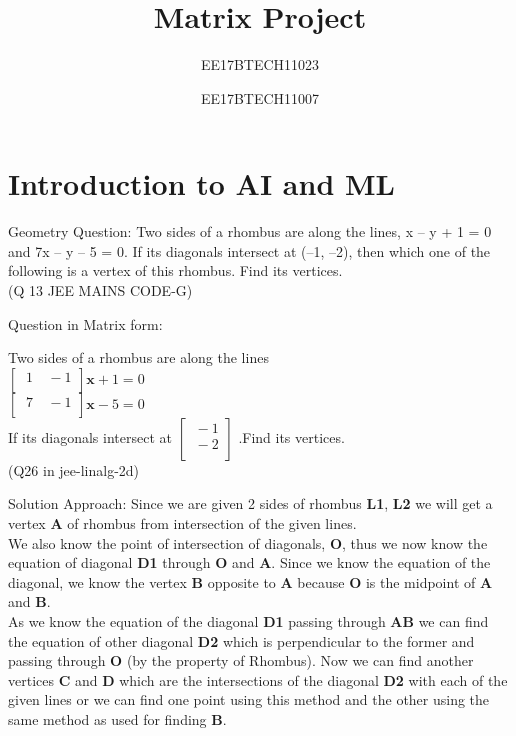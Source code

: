 \documentclass{beamer}
\title{Matrix Project}
\author{EE17BTECH11023 \and EE17BTECH11007}
\begin{document}
\section{Introduction to AI and ML}
\maketitle

\begin{frame}{Geometry Question:}
Two sides of a rhombus are along the lines,
x – y + 1 = 0 and 7x – y – 5 = 0. If its diagonals
intersect at (–1, –2), then which one of the
following is a vertex of this rhombus.
Find its vertices.\\
(Q 13 JEE MAINS CODE-G)

    
\end{frame}

\begin{frame}{Question in Matrix form:}

Two sides of a rhombus are along the lines\\
$ \begin{bmatrix}
  \ 1 &\ -1 \\
\end{bmatrix}
\textbf{x} + 1 = 0 $ \\ 
$  \begin{bmatrix}
  \ 7 &  \ -1 \\
\end{bmatrix} \textbf{x} - 5 = 0 $\\
If its diagonals intersect at
$ 
\begin{bmatrix}
  \ -1 \\
  \ -2 \\
\end{bmatrix}
$
.Find its vertices.\\
(Q26 in jee-linalg-2d)

    
\end{frame}

\begin{frame}{Solution Approach:}
Since we are given 2 sides of rhombus \textbf{L1}, \textbf{L2} we will get a vertex \textbf{A} of rhombus from intersection of the given lines.\\
We also know the point of intersection of diagonals, \textbf{O}, thus we now know the equation of diagonal \textbf{D1}  through \textbf{O} and \textbf{A}.
Since we know the equation of the diagonal, we know the vertex \textbf{B} opposite to \textbf{A} because \textbf{O} is the midpoint of \textbf{A} and \textbf{B}.\\As we know the equation of the diagonal \textbf{D1} passing through \textbf{A}\textbf{B} we can find the equation of other diagonal \textbf{D2} which is perpendicular to the former and passing through \textbf{O} (by the property of Rhombus). Now we can find another vertices \textbf{C} and \textbf{D} which are the intersections of the diagonal \textbf{D2} with each of the given lines or we can find one point using this method and the other using the same method as used for finding \textbf{B}.
    
\end{frame}
\end{document}
